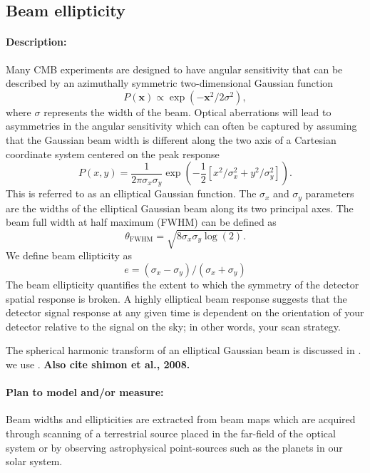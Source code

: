 \subsection{Beam ellipticity}

\paragraph{Description:}
Many CMB experiments are designed to have angular sensitivity that can be described by an azimuthally symmetric two-dimensional Gaussian function
\begin{equation} 
P (\mathbf{x}) \propto \exp (-\mathbf{x} ^2/2\sigma ^2),
\end{equation}
where $\sigma$ represents the width of the beam. Optical aberrations will lead to asymmetries in the angular sensitivity which can often be captured by assuming that the Gaussian beam width is different along the two axis of a Cartesian coordinate system centered on the peak response
\begin{equation}
P (x,y) = \frac{1}{2\pi \sigma_x \sigma_y} \exp (-\frac{1}{2}[x^2/\sigma ^2_x + y^2/\sigma ^2_y]).
\end{equation}
This is referred to as an elliptical Gaussian function. The $\sigma_x$ and $\sigma_y$ parameters are the widths of the elliptical Gaussian beam along its two principal axes. The beam full width at half maximum (FWHM) can be defined as
\begin{equation}
\theta _\mathrm{FWHM} = \sqrt{8\sigma_x \sigma_y\log{(2)}}. 
\end{equation}
We define beam ellipticity as 
\begin{equation}
e = (\sigma_x-\sigma_y)/(\sigma_x+\sigma_y)
\end{equation}
The beam ellipticity quantifies the extent to which the symmetry of the detector spatial response is broken. A highly elliptical beam response suggests that the detector signal response at any given time is dependent on the orientation of your detector relative to the signal on the sky; in other words, your scan strategy.

The spherical harmonic transform of an elliptical Gaussian beam is discussed in \cite{Souradeep2001}. we use \cite{Takahashi2010}. \textbf{Also cite shimon et al., 2008.}

\paragraph{Plan to model and/or measure:}
Beam widths and ellipticities are extracted from beam maps which are acquired through scanning of a terrestrial source placed in the far-field of the optical system or by observing astrophysical point-sources such as the planets in our solar system. 

